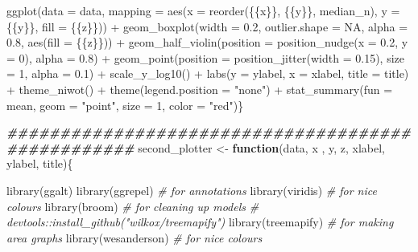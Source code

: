 \documentclass[a4paper,nobind]{templates/ociamthesis}
\newenvironment{Shaded}{\begin{snugshade}}{\end{snugshade}}
\newcommand{\AttributeTok}[1]{\textcolor[rgb]{0.77,0.63,0.00}{#1}}
\newcommand{\CommentTok}[1]{\textcolor[rgb]{0.56,0.35,0.01}{\textit{#1}}}
\newcommand{\ConstantTok}[1]{\textcolor[rgb]{0.00,0.00,0.00}{#1}}
\newcommand{\ControlFlowTok}[1]{\textcolor[rgb]{0.13,0.29,0.53}{\textbf{#1}}}
\newcommand{\DecValTok}[1]{\textcolor[rgb]{0.00,0.00,0.81}{#1}}
\newcommand{\DocumentationTok}[1]{\textcolor[rgb]{0.56,0.35,0.01}{\textbf{\textit{#1}}}}
\newcommand{\FloatTok}[1]{\textcolor[rgb]{0.00,0.00,0.81}{#1}}
\newcommand{\FunctionTok}[1]{\textcolor[rgb]{0.00,0.00,0.00}{#1}}
\newcommand{\NormalTok}[1]{#1}
\newcommand{\OtherTok}[1]{\textcolor[rgb]{0.56,0.35,0.01}{#1}}
\newcommand{\SpecialCharTok}[1]{\textcolor[rgb]{0.00,0.00,0.00}{#1}}
\newcommand{\StringTok}[1]{\textcolor[rgb]{0.31,0.60,0.02}{#1}}
\renewenvironment{Shaded}
{
  \vspace{10pt}%
  \begin{snugshade}%
}{%
  \end{snugshade}%
  \vspace{8pt}%
}
\begin{document}
\begin{landscape}
\begin{Shaded}
\begin{Highlighting}[]
  \FunctionTok{ggplot}\NormalTok{(}\AttributeTok{data =}\NormalTok{ data, }\AttributeTok{mapping =} \FunctionTok{aes}\NormalTok{(}\AttributeTok{x =} \FunctionTok{reorder}\NormalTok{(\{\{x\}\}, \{\{y\}\}, median\_n), }
  \AttributeTok{y =}\NormalTok{ \{\{y\}\}, }\AttributeTok{fill =}\NormalTok{ \{\{z\}\})) }\SpecialCharTok{+} 
  \FunctionTok{geom\_boxplot}\NormalTok{(}\AttributeTok{width =} \FloatTok{0.2}\NormalTok{, }\AttributeTok{outlier.shape =} \ConstantTok{NA}\NormalTok{, }\AttributeTok{alpha =} \FloatTok{0.8}\NormalTok{, }\FunctionTok{aes}\NormalTok{(}\AttributeTok{fill =}\NormalTok{ \{\{z\}\})) }\SpecialCharTok{+}
  \FunctionTok{geom\_half\_violin}\NormalTok{(}\AttributeTok{position =} \FunctionTok{position\_nudge}\NormalTok{(}\AttributeTok{x =} \FloatTok{0.2}\NormalTok{, }\AttributeTok{y =} \DecValTok{0}\NormalTok{), }\AttributeTok{alpha =} \FloatTok{0.8}\NormalTok{) }\SpecialCharTok{+} 
    \FunctionTok{geom\_point}\NormalTok{(}\AttributeTok{position =} \FunctionTok{position\_jitter}\NormalTok{(}\AttributeTok{width =} \FloatTok{0.15}\NormalTok{), }\AttributeTok{size =} \DecValTok{1}\NormalTok{, }\AttributeTok{alpha =} \FloatTok{0.1}\NormalTok{) }\SpecialCharTok{+} 
    \FunctionTok{scale\_y\_log10}\NormalTok{() }\SpecialCharTok{+} \FunctionTok{labs}\NormalTok{(}\AttributeTok{y =}\NormalTok{ ylabel, }\AttributeTok{x =}\NormalTok{ xlabel, }
  \AttributeTok{title =}\NormalTok{ title) }\SpecialCharTok{+} 
  \FunctionTok{theme\_niwot}\NormalTok{() }\SpecialCharTok{+} 
  \FunctionTok{theme}\NormalTok{(}\AttributeTok{legend.position =} \StringTok{"none"}\NormalTok{) }\SpecialCharTok{+} 
  \FunctionTok{stat\_summary}\NormalTok{(}\AttributeTok{fun =}\NormalTok{ mean, }\AttributeTok{geom =} \StringTok{"point"}\NormalTok{, }
                \AttributeTok{size =} \DecValTok{1}\NormalTok{, }\AttributeTok{color =} \StringTok{"red"}\NormalTok{)\}}

\DocumentationTok{\#\#\#\#\#\#\#\#\#\#\#\#\#\#\#\#\#\#\#\#\#\#\#\#\#\#\#\#\#\#\#\#\#\#\#\#\#\#\#\#\#\#\#\#\#\#\#\#\#\#}
\NormalTok{second\_plotter }\OtherTok{\textless{}{-}} \ControlFlowTok{function}\NormalTok{(data, x , y, z, xlabel, ylabel, title)\{}

\FunctionTok{library}\NormalTok{(ggalt)  }
\FunctionTok{library}\NormalTok{(ggrepel)  }\CommentTok{\# for annotations}
\FunctionTok{library}\NormalTok{(viridis)  }\CommentTok{\# for nice colours}
\FunctionTok{library}\NormalTok{(broom)  }\CommentTok{\# for cleaning up models}
\CommentTok{\# devtools::install\_github("wilkox/treemapify")}
\FunctionTok{library}\NormalTok{(treemapify)  }\CommentTok{\# for making area graphs}
\FunctionTok{library}\NormalTok{(wesanderson)  }\CommentTok{\# for nice colours}


\end{Highlighting}
\end{Shaded}
\end{landscape}
\end{document}
